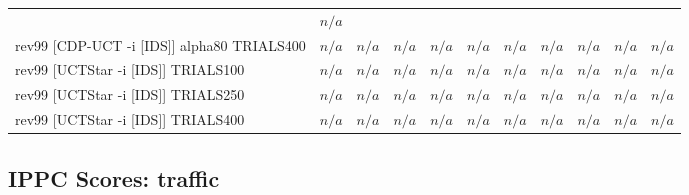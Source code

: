 \documentclass{article}
\begin{document}
\begin{tabular}{|l|r@{$\pm$}rr@{$\pm$}rr@{$\pm$}rr@{$\pm$}rr@{$\pm$}rr@{$\pm$}rr@{$\pm$}rr@{$\pm$}rr@{$\pm$}rr@{$\pm$}r|}
& \multicolumn{2}{c|}{\textbf{$n/a$}}
\\
rev99 [CDP-UCT -i [IDS]] alpha80 TRIALS400
& \multicolumn{2}{c}{\textbf{$n/a$}}
& \multicolumn{2}{c}{\textbf{$n/a$}}
& \multicolumn{2}{c}{\textbf{$n/a$}}
& \multicolumn{2}{c}{\textbf{$n/a$}}
& \multicolumn{2}{c}{\textbf{$n/a$}}
& \multicolumn{2}{c}{\textbf{$n/a$}}
& \multicolumn{2}{c}{\textbf{$n/a$}}
& \multicolumn{2}{c}{\textbf{$n/a$}}
& \multicolumn{2}{c}{\textbf{$n/a$}}
& \multicolumn{2}{c|}{\textbf{$n/a$}}
\\
rev99 [UCTStar -i [IDS]] TRIALS100
& \multicolumn{2}{c}{\textbf{$n/a$}}
& \multicolumn{2}{c}{\textbf{$n/a$}}
& \multicolumn{2}{c}{\textbf{$n/a$}}
& \multicolumn{2}{c}{\textbf{$n/a$}}
& \multicolumn{2}{c}{\textbf{$n/a$}}
& \multicolumn{2}{c}{\textbf{$n/a$}}
& \multicolumn{2}{c}{\textbf{$n/a$}}
& \multicolumn{2}{c}{\textbf{$n/a$}}
& \multicolumn{2}{c}{\textbf{$n/a$}}
& \multicolumn{2}{c|}{\textbf{$n/a$}}
\\
rev99 [UCTStar -i [IDS]] TRIALS250
& \multicolumn{2}{c}{\textbf{$n/a$}}
& \multicolumn{2}{c}{\textbf{$n/a$}}
& \multicolumn{2}{c}{\textbf{$n/a$}}
& \multicolumn{2}{c}{\textbf{$n/a$}}
& \multicolumn{2}{c}{\textbf{$n/a$}}
& \multicolumn{2}{c}{\textbf{$n/a$}}
& \multicolumn{2}{c}{\textbf{$n/a$}}
& \multicolumn{2}{c}{\textbf{$n/a$}}
& \multicolumn{2}{c}{\textbf{$n/a$}}
& \multicolumn{2}{c|}{\textbf{$n/a$}}
\\
rev99 [UCTStar -i [IDS]] TRIALS400
& \multicolumn{2}{c}{\textbf{$n/a$}}
& \multicolumn{2}{c}{\textbf{$n/a$}}
& \multicolumn{2}{c}{\textbf{$n/a$}}
& \multicolumn{2}{c}{\textbf{$n/a$}}
& \multicolumn{2}{c}{\textbf{$n/a$}}
& \multicolumn{2}{c}{\textbf{$n/a$}}
& \multicolumn{2}{c}{\textbf{$n/a$}}
& \multicolumn{2}{c}{\textbf{$n/a$}}
& \multicolumn{2}{c}{\textbf{$n/a$}}
& \multicolumn{2}{c|}{\textbf{$n/a$}}
\\
\hline
\end{tabular}%

\bigskip

\subsection*{IPPC Scores: traffic}
\end{document}
